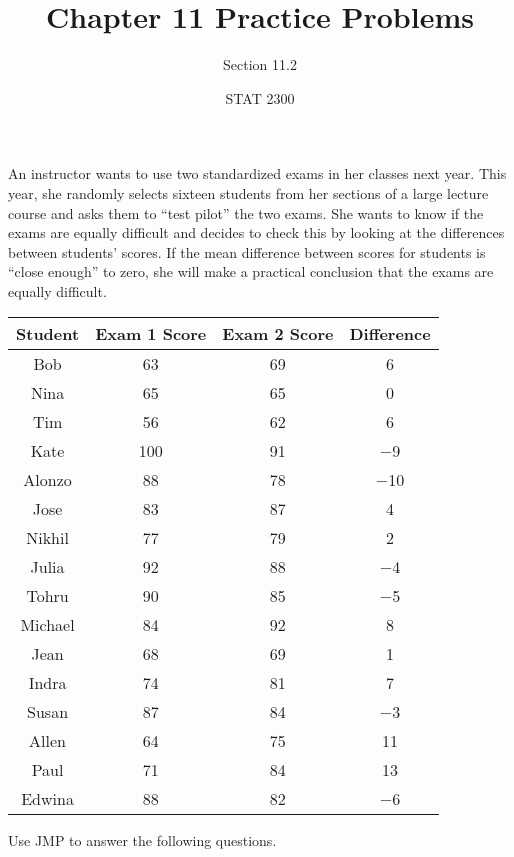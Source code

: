 \documentclass[noanswers]{exam}
\title{Chapter 11 Practice Problems}
\author{Section 11.2}
\date{STAT 2300}
\begin{document}
%

\noindent An instructor wants to use two standardized exams in her classes next year. This year, she randomly selects sixteen students from her sections of a large lecture course and asks them to ``test pilot'' the two exams. She wants to know if the exams are equally difficult and decides to check this by looking at the differences between students' scores. If the mean difference between scores for students is ``close enough'' to zero, she will make a practical conclusion that the exams are equally difficult.

\vspace{1mm}

\begin{center}
\begin{tabular}{|c|c|c|c|}
\hline
\textbf{Student} & \textbf{Exam 1 Score} & \textbf{Exam 2 Score} & \textbf{Difference} \\
\hline
Bob & 63 & 69 & 6 \\ 
\hline
Nina & 65 & 65 & 0 \\
\hline
Tim & 56 & 62 & 6 \\
\hline
Kate & 100 & 91 & $-$9 \\
\hline
Alonzo & 88 & 78 & $-$10 \\ 
\hline
Jose & 83 & 87 & 4 \\
\hline
Nikhil & 77 & 79 & 2 \\ 
\hline 
Julia & 92 & 88 & $-$4 \\ 
\hline
Tohru & 90 & 85 & $-$5 \\
\hline 
Michael & 84 & 92 & 8 \\
\hline
Jean & 68 & 69 & 1 \\
\hline
Indra & 74 & 81 & 7 \\
\hline 
Susan & 87 & 84 & $-$3 \\
\hline
Allen & 64 & 75 & 11 \\
\hline
Paul & 71 & 84 & 13 \\
\hline 
Edwina & 88 & 82 & $-$6 \\
\hline
\end{tabular}
\end{center}

\vspace{2mm}

\noindent Use JMP to answer the following questions.
\end{document}
